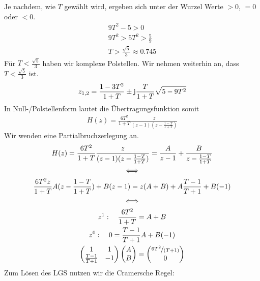 \documentclass[11pt,a4paper,DIV=12]{scrartcl}
\begin{document}
Je nachdem, wie $T$ gewählt wird, ergeben sich unter der Wurzel Werte $>0$, $=0$ oder $<0$.
\begin{gather}
	9T^2-5>0\\
	9T^2>5
	T^2>\frac{5}{9}\\
	T>\frac{\sqrt{5}}{3}\approx0.745
\end{gather}
Für $T<\frac{\sqrt{5}}{3}$ haben wir komplexe Polstellen. Wir nehmen weiterhin an, dass $T<\frac{\sqrt{5}}{3}$ ist.
\begin{gather}
	z_{1,2}=\frac{1-3T^2}{1+T}\pm\im\frac{T}{1+T}\sqrt{5-9T^2}
\end{gather}
In Null-/Polstellenform lautet die Übertragungsfunktion somit
\begin{gather}
	H(z)=\frac{6T^2}{1+T}\frac{z}{(z-1)(z-\frac{1-T}{1+T})}
\end{gather}
Wir wenden eine Partialbruchzerlegung an.
\begin{gather}
	H(z)=\frac{6T^2}{1+T}\frac{z}{(z-1)(z-\frac{1-T}{1+T})}=\frac{A}{z-1}+\frac{B}{z-\frac{1-T}{1+T}}\\
	\Longleftrightarrow\nonumber\\
	\frac{6T^2z}{1+T}A(z-\frac{1-T}{1+T})+B(z-1)=z(A+B)+A\frac{T-1}{T+1}+B(-1)\\
	\Longleftrightarrow\nonumber\\
	z^1:\quad \frac{6T^2}{1+T}=A+B\\
	z^0:\quad 0=\frac{T-1}{T+1}A+B(-1)\\
	\begin{pmatrix}
		1 & 1\\
		\frac{T-1}{T+1} & -1
	\end{pmatrix}
	\begin{pmatrix}
		A \\
		B
	\end{pmatrix}
	=
	\begin{pmatrix}
		\nicefrac{6T^2}{(T+1)} \\
		0
	\end{pmatrix}
\end{gather}
Zum Lösen des LGS nutzen wir die Cramersche Regel:
\end{document}
